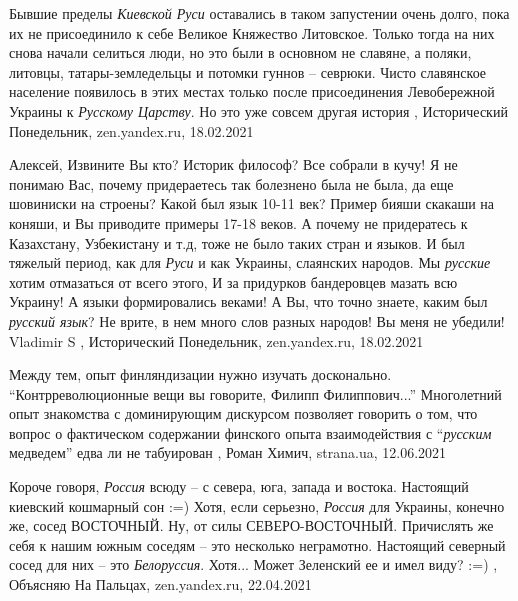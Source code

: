 Бывшие пределы \emph{Киевской Руси} оставались в таком запустении очень долго, пока их
не присоединило к себе Великое Княжество Литовское. Только тогда на них снова
начали селиться люди, но это были в основном не славяне, а поляки, литовцы,
татары-земледельцы и потомки гуннов – севрюки. Чисто славянское население
появилось в этих местах только после присоединения Левобережной Украины к
\emph{Русскому Царству}. Но это уже совсем другая история
, 
Исторический Понедельник, zen.yandex.ru, 18.02.2021

Алексей, Извините Вы кто? Историк философ? Все собрали в кучу! Я не понимаю
Вас, почему придераетесь так болезнено была не была, да еще шовиниски на
строены? Какой был язык 10-11 век? Пример бияши скакаши на коняши, и Вы
приводите примеры 17-18 веков. А почему не придератесь к Казахстану,
Узбекистану и т.д, тоже не было таких стран и языков. И был тяжелый период, как
для \emph{Руси} и как Украины, слаянских народов. Мы \emph{русские} хотим отмазаться от всего
этого, И за придурков бандеровцев мазать всю Украину! А языки формировались
веками! А Вы, что точно знаете, каким был \emph{русский язык}? Не врите, в нем много слов
разных народов! Вы меня не убедили!
Vladimir S
, 
Исторический Понедельник, zen.yandex.ru, 18.02.2021

Между тем, опыт финляндизации нужно изучать досконально.
\enquote{Контрреволюционные вещи вы говорите, Филипп Филиппович...} Многолетний
опыт знакомства с доминирующим дискурсом позволяет говорить о том, что вопрос о
фактическом содержании финского опыта взаимодействия с \enquote{\emph{русским}
медведем} едва ли не табуирован
, 
Роман Химич, strana.ua, 12.06.2021

Короче говоря, \emph{Россия} всюду – с севера, юга, запада и востока. Настоящий
киевский кошмарный сон :=) Хотя, если серьезно, \emph{Россия} для Украины, конечно же,
сосед ВОСТОЧНЫЙ. Ну, от силы СЕВЕРО-ВОСТОЧНЫЙ.  Причислять же себя к нашим
южным соседям – это несколько неграмотно. Настоящий северный сосед для них –
это \emph{Белоруссия}. Хотя... Может Зеленский ее и имел виду? :=)
, 
Объясняю На Пальцах, zen.yandex.ru, 22.04.2021

